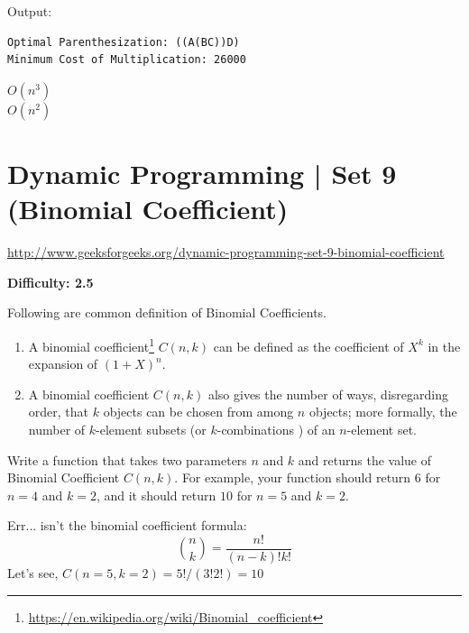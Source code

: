 Output:
\begin{lstlisting}[style=rayio]
Optimal Parenthesization: ((A(BC))D)
Minimum Cost of Multiplication: 26000
\end{lstlisting}
 $O(n^3)$\\
 $O(n^2)$


\section{Dynamic Programming | Set 9 (Binomial Coefficient)
  \label{secGFGDPSet9BinomCoeff}}

\url{http://www.geeksforgeeks.org/dynamic-programming-set-9-binomial-coefficient}

\textbf{Difficulty: 2.5}

Following are common definition of Binomial Coefficients.
\begin{enumerate}[label=\textbf{\arabic*.}]
\item A binomial
  coefficient\footnote{\url{https://en.wikipedia.org/wiki/Binomial\_coefficient}}
  $C(n,k)$ can be defined as the coefficient of $X^k$ in the expansion of
  $(1+X)^n$.
\item A binomial coefficient $C(n,k)$ also gives the number of ways,
  disregarding order, that $k$ objects can be chosen from among $n$ objects;
  more formally, the number of $k$-element subsets (or $k$-combinations
  ) of an $n$-element set.
\end{enumerate}


Write a function that takes two parameters $n$ and $k$ and returns the value
of Binomial Coefficient $C(n,k)$. For example, your function should return
$6$ for $n=4$ and $k=2$, and it should return $10$ for $n=5$ and $k = 2$.

\textbf{}

\RayNotesBegin

Err... isn't the binomial coefficient formula:
\begin{equation*}
\binom{n}{k} = \frac{n!}{(n-k)!k!}
\end{equation*}
Let's see, $C(n=5,k=2) = 5!/(3!2!) = 10$

